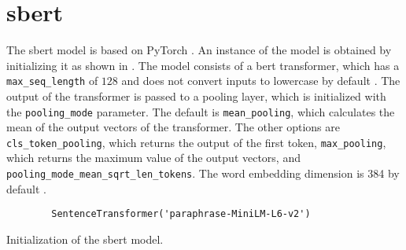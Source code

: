 \section{\ac{sbert}}\label{sec:impl-sbert}

The \ac{sbert} model is based on PyTorch \cite{HfsentTrans2019}.
An instance of the model is obtained by initializing it as shown in .
The model consists of a \ac{bert} transformer, which has a \texttt{max\_seq\_length} of $128$ and 
does not convert inputs to lowercase by default \cite{sbert-dev}.
The output of the transformer is passed to a pooling layer, which is initialized with the \texttt{pooling\_mode} parameter.
The default is \texttt{mean\_pooling}, which calculates the mean of the output vectors of the transformer.
The other options are \texttt{cls\_token\_pooling}, which returns the output of the first token, 
\texttt{max\_pooling}, which returns the maximum value of the output vectors,
and \texttt{pooling\_mode\_mean\_sqrt\_len\_tokens}.
The word embedding dimension is 384 by default \cite{sbert-dev}.

\begin{listing}[htp]
    \begin{verbatim}
        SentenceTransformer('paraphrase-MiniLM-L6-v2')
    \end{verbatim}
    \caption{Initialization of the \ac{sbert} model.
    }
    \label{lst:impl-sbert}
\end{listing}